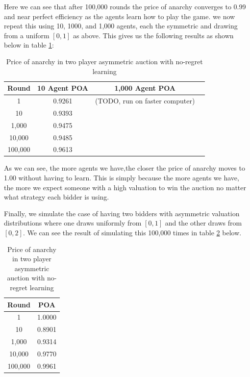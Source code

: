 \documentclass[12pt,twoside]{reedthesis}
\begin{document}
Here we can see that after 100,000 rounds the price of anarchy converges to 0.99 and near perfect efficiency as the agents learn how to play the game. we now repeat this using 10, 1000, and 1,000 agents, each the symmetric and drawing from a uniform $[0,1]$ as above. This gives us the following results as shown  below in table \ref{table:4}:

\begin{table}[h!]
	\begin{center}
		\begin{tabular}{ |c|c|c|c| }
			\hline
			Round & 10 Agent POA & 1,000 Agent POA\\
			\hline
			1 & 0.9261 & (TODO, run on faster computer)\\
			10 & 0.9393 & \\
			1,000 & 0.9475 & \\
			10,000 & 0.9485 &\\
			100,000 & 0.9613 & \\
			\hline
		\end{tabular}
		\caption{Price of anarchy in two player asymmetric auction with no-regret learning}
		\label{table:4}
	\end{center} 
\end{table}

As we can see, the more agents we have,the closer the price of anarchy moves to 1.00 without having to learn. This is simply because the more agents we have, the more we expect someone with a high valuation to win the auction no matter what strategy each bidder is using.

Finally, we simulate the case of having two bidders with asymmetric valuation distributions where one draws uniformly from $[0,1]$ and the other draws from $[0,2]$. We can see the result of simulating this 100,000 times in table \ref{table:5} below.

\begin{table}[h!]
	\begin{center}
		\begin{tabular}{ |c|c| }
			\hline
			Round & POA \\
			\hline
			1 & 1.0000 \\
			10 & 0.8901 \\
			1,000 & 0.9314 \\
			10,000 & 0.9770 \\
			100,000 & 0.9961 \\
			\hline
		\end{tabular}
		\caption{Price of anarchy in two player asymmetric auction with no-regret learning}
		\label{table:5}
	\end{center} 
\end{table}
\end{document}
